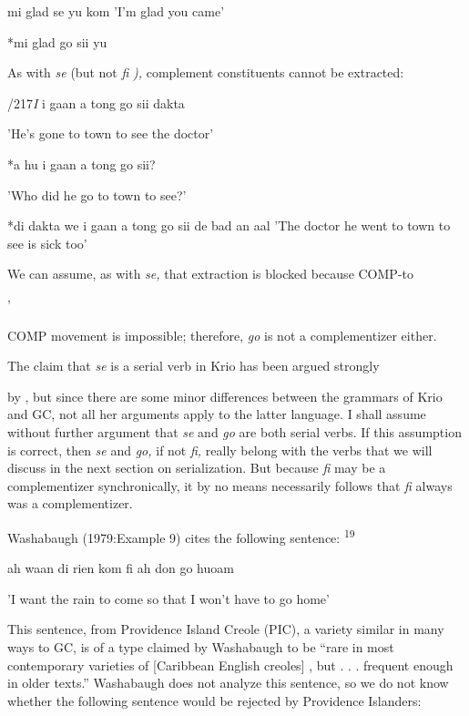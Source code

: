 \ea\label{ex:215}
 mi glad se yu kom 'I'm glad you came'
\glt
\z

\ea\label{ex:216}
 *mi glad go sii yu
\glt
\z

As with \textit{se }(but not \textit{fi} \textit{),} complement constituents cannot be extracted:

/217\textit{I} i gaan a tong go sii dakta

'He's gone to town to see the doctor'

\ea\label{ex:218}
 *a hu i gaan a tong go sii?
\glt
\z

'Who did he go to town to see?'

\ea\label{ex:219}
 *di dakta we i gaan a tong go sii de bad an aal 'The doctor he went to town to see is sick too'
\glt
\z

We can assume, as with \textit{se,} that extraction is blocked because COMP-to\-

'


COMP movement is impossible; therefore, \textit{go} is not a complementizer either.

The claim that \textit{se }is a serial verb in Krio has been argued strongly

by \citet{Larimore1976}, but since there are some minor differences be\-tween the grammars of Krio and GC, not all her arguments apply to the latter language. I shall assume without further argument that \textit{se} and \textit{go} are both serial verbs. If this assumption is correct, then \textit{se} and \textit{go,} if not \textit{fi,} really belong with the verbs that we will discuss in the next section on serialization. But because \textit{fi} may be a comple\-mentizer synchronically, it by no means necessarily follows that \textit{fi} always was a complementizer.

Washabaugh (1979:Example 9) cites the following sentence: \textsuperscript{19}

\ea\label{ex:220}
 ah waan di rien kom fi ah don go huoam
\glt
\z

'I want the rain to come so that I won't have to go home'

This sentence, from Providence Island Creole (PIC), a variety similar in many ways to GC, is of a type claimed by Washabaugh to be ``rare in most contemporary varieties of [Caribbean English creoles] , but . . . frequent enough in older texts.'' Washabaugh does not analyze this sentence, so we do not know whether the following sentence would be rejected by Providence Islanders:

